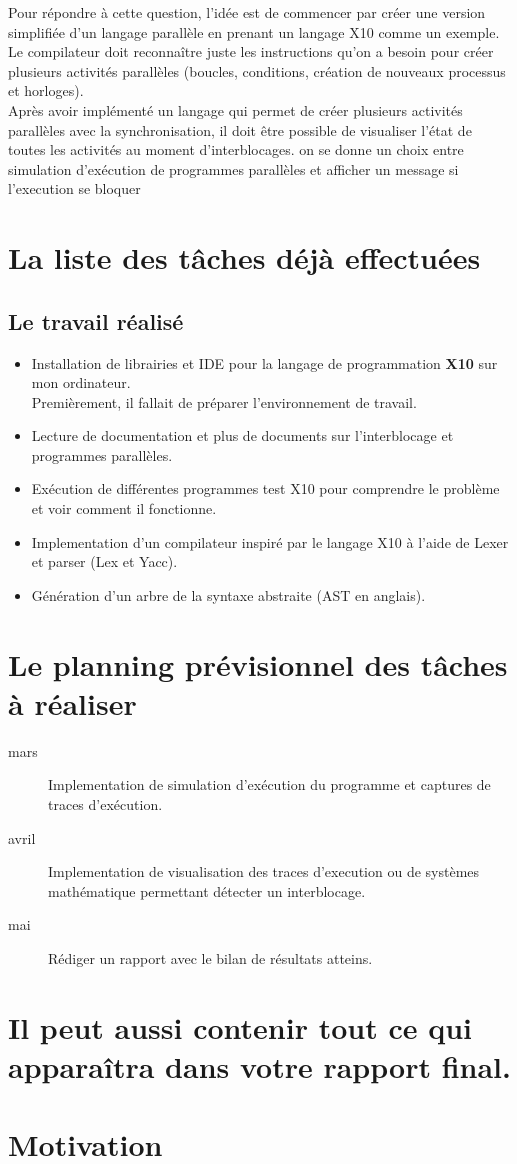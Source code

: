 \documentclass[12pt]{report}
\begin{document}
 Pour répondre à cette question, l'idée est de commencer par créer une version simplifiée d'un langage parallèle en prenant un langage X10 comme un exemple.
 Le compilateur doit reconnaître juste les instructions qu'on a besoin pour créer plusieurs activités parallèles (boucles, conditions, création de nouveaux processus et horloges).\\
 
 Après avoir implémenté un langage qui permet de créer plusieurs activités parallèles avec la synchronisation, il doit être possible de visualiser l'état de toutes les activités au moment d'interblocages.
  on se donne un choix entre simulation d'exécution de programmes parallèles et afficher un message si l'execution se bloquer


\section{La liste des tâches déjà effectuées}

\subsection{Le travail réalisé}
\begin{itemize}
 \item Installation de librairies et IDE pour la langage de programmation \textbf{X10} sur mon ordinateur.\\ Premièrement, il fallait de préparer l'environnement de travail.
 \item Lecture de documentation et plus de documents sur l'interblocage et programmes parallèles.
 \item Exécution de différentes programmes test X10 pour comprendre le problème et voir comment il fonctionne. 
 \item Implementation d'un compilateur inspiré par le langage X10 à l'aide de Lexer et parser (Lex et Yacc).
 \item Génération d'un arbre de la syntaxe abstraite (AST en anglais).
\end{itemize}

\newpage

\section{Le planning prévisionnel des tâches à réaliser}
\begin{description}
  \item[mars] Implementation de simulation d'exécution du programme et captures de traces d'exécution.
  \item[avril] Implementation de visualisation des traces d'execution ou de systèmes mathématique permettant détecter un interblocage.
  \item[mai] Rédiger un rapport avec le bilan de résultats atteins.
\end{description}

\section{Il peut aussi contenir tout ce qui apparaîtra dans votre rapport final. }

\section{Motivation}


 
 
\end{document}
